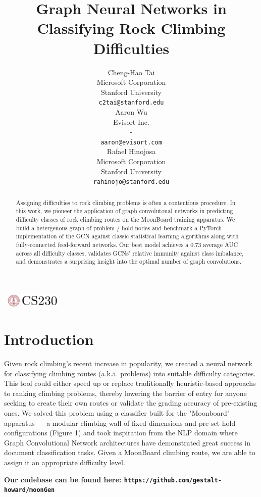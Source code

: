 \documentclass{article}
\title{Graph Neural Networks in Classifying Rock Climbing Difficulties}
\author{
  Cheng-Hao Tai \\
  Microsoft Corporation \\
  Stanford University \\
  \texttt{c2tai@stanford.edu} \\
  \And
  Aaron Wu \\
  Evisort Inc. \\
  - \\
  \texttt{aaron@evisort.com} \\
  \And
  Rafael Hinojosa \\
  Microsoft Corporation \\
  Stanford University \\
  \texttt{rahinojo@stanford.edu} \\
}
\begin{document}
\begin{center}
\includegraphics[width=3cm, height=0.7cm]{CS230}
\end{center}

\maketitle

\begin{abstract}
Assigning difficulties to rock climbing problems is often a contentious procedure. In this work, we pioneer the application of graph convolutonal networks in predicting difficulty classes of rock climbing routes on the MoonBoard training apparatus. We build a hetergenous graph of problem / hold nodes and benchmark a PyTorch implementation of the GCN against classic statistical learning algorithms along with fully-connected feed-forward networks. Our best model achieves a 0.73 average AUC across all difficulty classes, validates GCNs' relative immunity against class imbalance, and demonstrates a surprising insight into the optimal number of graph convolutions. 
\end{abstract}

\section{Introduction}	
Given rock climbing's recent increase in popularity, we created a neural network for classifying climbing routes (a.k.a. problems) into suitable difficulty categories. This tool could either speed up or replace traditionally heuristic-based approachs to ranking climbing problems, thereby lowering the barrier of entry for anyone seeking to create their own routes or validate the grading accuracy of pre-existing ones. We solved this problem using a classifier built for the "Moonboard" apparatus --- a modular climbing wall of fixed dimensions and pre-set hold configurations (Figure 1) and took inspiration from the NLP domain where Graph Convolutional Network architectures have demonstrated great success in document classification tasks. Given a MoonBoard climbing route, we are able to assign it an appropriate difficulty level.

{\small\textbf{Our codebase can be found here: \texttt{https://github.com/gestalt-howard/moonGen}}}
\end{document}
